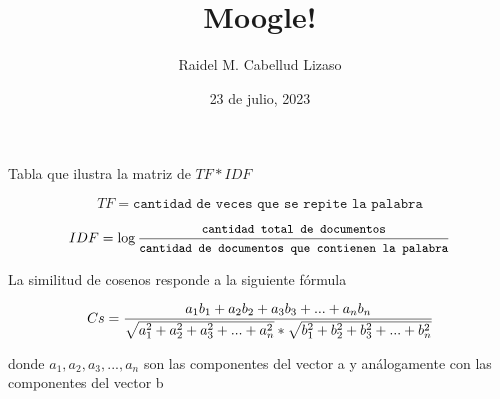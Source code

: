 \documentclass{slides} %
\begin{document}
\title {\textbf {Moogle!}}
\author {Raidel M. Cabellud Lizaso}
\date {23 de julio, 2023}
\maketitle


\begin {center}

\vspace{1cm}

Tabla que ilustra la matriz de $TF*IDF$

\end {center}

\newpage

\begin{flushleft}
     $$TF = \texttt{cantidad de veces que se repite la palabra}$$  
     
     $$IDF = \log{\frac{\small\texttt{cantidad total de documentos}}{\small\texttt{cantidad de documentos que contienen la palabra}}}$$
\end{flushleft}


\newpage


La similitud de cosenos responde a la siguiente f\'ormula

\begin{equation}
     \small
     Cs = \frac{a_1b_1+a_2b_2+a_3b_3+...+a_nb_n}{\sqrt{a_1^2+a_2^2+a_3^2+...+a_n^2}*\sqrt{b_1^2+b_2^2+b_3^2+...+b_n^2}}     
\end{equation}

donde $a_1, a_2, a_3,...,a_n$ son las componentes del vector a y an\'alogamente con las componentes del vector b
\end{document}
